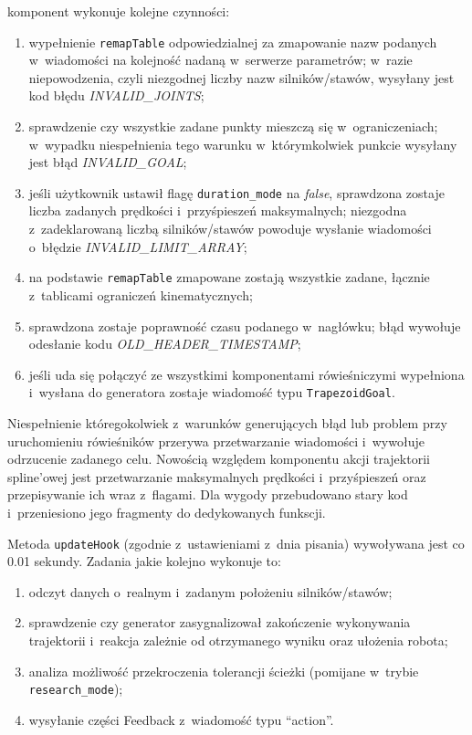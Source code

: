 \documentclass[a4paper, 12pt]{article}
\begin{document}
	komponent wykonuje kolejne czynności:
	\begin{enumerate}
	\item wypełnienie \texttt{remapTable} odpowiedzialnej za zmapowanie nazw podanych w~wiadomości na kolejność nadaną w~serwerze parametrów; w~razie niepowodzenia, czyli niezgodnej liczby nazw silników/stawów, wysyłany jest kod błędu \textit{INVALID\_JOINTS}; 
	\item sprawdzenie czy wszystkie zadane punkty mieszczą się w~ograniczeniach; w~wypadku niespełnienia tego warunku w~którymkolwiek punkcie wysyłany jest błąd  \textit{INVALID\_GOAL};
	\item jeśli użytkownik ustawił flagę \texttt{duration\_mode} na \textit{false}, sprawdzona zostaje liczba zadanych prędkości i~przyśpieszeń maksymalnych; niezgodna z~zadeklarowaną liczbą silników/stawów powoduje wysłanie wiadomości o~błędzie \textit{INVALID\_LIMIT\_ARRAY};
	\item na podstawie \texttt{remapTable} zmapowane zostają wszystkie zadane, łącznie z~tablicami ograniczeń kinematycznych;
	\item sprawdzona zostaje poprawność czasu podanego w~nagłówku; błąd wywołuje odesłanie kodu \textit{OLD\_HEADER\_TIMESTAMP};
	\item jeśli uda się połączyć ze wszystkimi komponentami rówieśniczymi wypełniona i~wysłana do generatora zostaje wiadomość typu \texttt{TrapezoidGoal}.
	\end{enumerate}
	Niespełnienie któregokolwiek z~warunków generujących błąd lub problem przy uruchomieniu rówieśników przerywa przetwarzanie wiadomości i~wywołuje odrzucenie zadanego celu. Nowością względem komponentu akcji trajektorii spline'owej jest przetwarzanie maksymalnych prędkości i~przyśpieszeń oraz przepisywanie ich wraz z~flagami. Dla wygody przebudowano stary kod i~przeniesiono jego fragmenty do dedykowanych funkscji.
	\par Metoda \texttt{updateHook} (zgodnie z~ustawieniami z~dnia pisania) wywoływana jest co 0.01 sekundy. Zadania jakie kolejno wykonuje to:
	\begin{enumerate}
	\item odczyt danych o~realnym i~zadanym położeniu silników/stawów;
	\item sprawdzenie czy generator zasygnalizował zakończenie wykonywania trajektorii i~reakcja zależnie od otrzymanego wyniku oraz ułożenia robota;
	\item analiza możliwość przekroczenia tolerancji ścieżki (pomijane w~trybie \texttt{research\_mode});
	\item wysyłanie części Feedback z~wiadomość typu \textquotedblleft action\textquotedblright.
	\end{enumerate}
\end{document}
